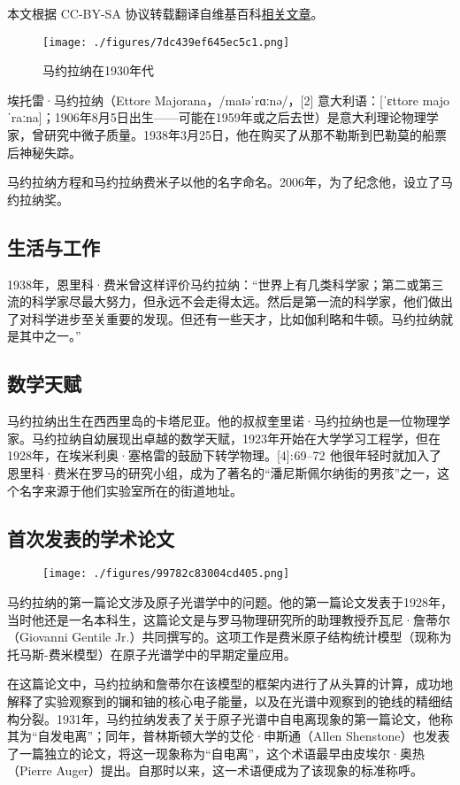 
本文根据 CC-BY-SA 协议转载翻译自维基百科\href{https://en.wikipedia.org/wiki/Arthur_Compton}{相关文章}。

\begin{figure}[ht]
\centering
\texttt{[image: ./figures/7dc439ef645ec5c1.png]}
\caption{马约拉纳在1930年代} \label{fig_ATL_1}
\end{figure}
埃托雷·马约拉纳（Ettore Majorana，/maɪəˈrɑːnə/，[2] 意大利语：[ˈɛttore majoˈraːna]；1906年8月5日出生——可能在1959年或之后去世）是意大利理论物理学家，曾研究中微子质量。1938年3月25日，他在购买了从那不勒斯到巴勒莫的船票后神秘失踪。

马约拉纳方程和马约拉纳费米子以他的名字命名。2006年，为了纪念他，设立了马约拉纳奖。
\subsection{生活与工作}
1938年，恩里科·费米曾这样评价马约拉纳：“世界上有几类科学家；第二或第三流的科学家尽最大努力，但永远不会走得太远。然后是第一流的科学家，他们做出了对科学进步至关重要的发现。但还有一些天才，比如伽利略和牛顿。马约拉纳就是其中之一。”
\subsection{数学天赋} 
马约拉纳出生在西西里岛的卡塔尼亚。他的叔叔奎里诺·马约拉纳也是一位物理学家。马约拉纳自幼展现出卓越的数学天赋，1923年开始在大学学习工程学，但在1928年，在埃米利奥·塞格雷的鼓励下转学物理。[4]: 69–72  他很年轻时就加入了恩里科·费米在罗马的研究小组，成为了著名的“潘尼斯佩尔纳街的男孩”之一，这个名字来源于他们实验室所在的街道地址。
\subsection{首次发表的学术论文}
\begin{figure}[ht]
\centering
\texttt{[image: ./figures/99782c83004cd405.png]}
\caption{} \label{fig_ATL_2}
\end{figure}

马约拉纳的第一篇论文涉及原子光谱学中的问题。他的第一篇论文发表于1928年，当时他还是一名本科生，这篇论文是与罗马物理研究所的助理教授乔瓦尼·詹蒂尔（Giovanni Gentile Jr.）共同撰写的。这项工作是费米原子结构统计模型（现称为托马斯-费米模型）在原子光谱学中的早期定量应用。

在这篇论文中，马约拉纳和詹蒂尔在该模型的框架内进行了从头算的计算，成功地解释了实验观察到的镧和铀的核心电子能量，以及在光谱中观察到的铯线的精细结构分裂。1931年，马约拉纳发表了关于原子光谱中自电离现象的第一篇论文，他称其为“自发电离”；同年，普林斯顿大学的艾伦·申斯通（Allen Shenstone）也发表了一篇独立的论文，将这一现象称为“自电离”，这个术语最早由皮埃尔·奥热（Pierre Auger）提出。自那时以来，这一术语便成为了该现象的标准称呼。


